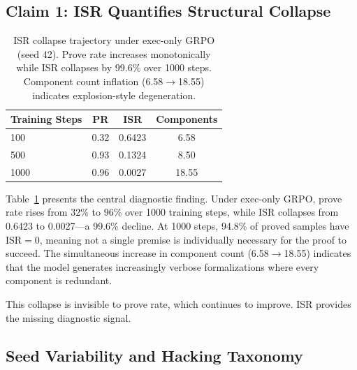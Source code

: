 \documentclass[11pt,a4paper]{article}
\begin{document}
\subsection{Claim 1: ISR Quantifies Structural Collapse}
\label{sec:claim1}

\begin{table}[t]
\centering
\small
\begin{tabular}{lccc}
\toprule
\textbf{Training Steps} & \textbf{PR} & \textbf{ISR} & \textbf{Components} \\
\midrule
100 & 0.32 & 0.6423 & 6.58 \\
500 & 0.93 & 0.1324 & 8.50 \\
1000 & 0.96 & 0.0027 & 18.55 \\
\bottomrule
\end{tabular}
\caption{ISR collapse trajectory under exec-only GRPO (seed 42). Prove rate increases monotonically while ISR collapses by 99.6\% over 1000 steps. Component count inflation (6.58$\to$18.55) indicates explosion-style degeneration.}
\label{tab:collapse}
\end{table}

Table~\ref{tab:collapse} presents the central diagnostic finding. Under exec-only GRPO, prove rate rises from 32\% to 96\% over 1000 training steps, while ISR collapses from 0.6423 to 0.0027---a 99.6\% decline. At 1000 steps, 94.8\% of proved samples have ISR$=$0, meaning not a single premise is individually necessary for the proof to succeed. The simultaneous increase in component count (6.58$\to$18.55) indicates that the model generates increasingly verbose formalizations where every component is redundant.

This collapse is invisible to prove rate, which continues to improve. ISR provides the missing diagnostic signal.

\subsection{Seed Variability and Hacking Taxonomy}
\end{document}
